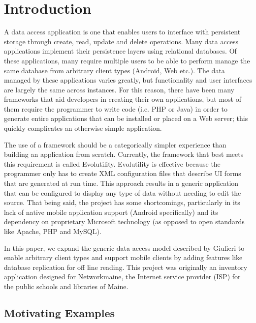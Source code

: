 \section{Introduction} \label{sec:intro}




A data access application is one that enables users to interface with
persistent storage through create, read, update and delete operations. Many data
access applications implement their
persistence layers using relational databases. Of these applications, many
require multiple users to be able to perform manage the same
database from arbitrary client types (Android, Web
etc.). The data managed by these applications varies greatly, but functionality
and user interfaces are largely the same across instances. For this reason,
there have been many frameworks that aid developers in creating their own 
applications, but most of them require the programmer to write code (i.e. PHP or
Java) in order to generate entire applications that can be installed or placed
on a Web server; this quickly complicates an otherwise simple application. 

The use of a framework should be a categorically simpler experience than
building an application from scratch. Currently, the framework that best
meets this requirement is called Evolutility. Evolutility
is effective because the programmer only has to create XML configuration files
that describe UI forms that are generated at run time. This approach results in
a generic application that can be configured to display any type of data without
needing to edit the source. That being said, the project has some shortcomings,
particularly in its lack of native mobile application support (Android
specifically) and its dependency on proprietary Microsoft technology (as opposed
to open standards like Apache, PHP and MySQL). 

In this paper, we expand the generic data access model described by
Giulieri to enable arbitrary client types and support mobile clients by adding
features like database replication for off line
reading\cite{giulieri_minimalist_2011}. This project was originally an inventory
application designed for Networkmaine, the Internet service provider (ISP) for
the public schools and libraries of Maine.


\subsection{Motivating Examples} \label{sec:motivation}

